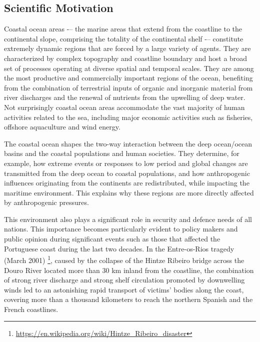 \subsection{Scientific Motivation}

Coastal ocean areas -– the marine areas that extend from the coastline
to the continental slope, comprising the totality of the continental
shelf -– constitute extremely dynamic regions that are forced by a
large variety of agents. They are characterized by complex topography
and coastline boundary and host a broad set of processes operating at
diverse spatial and temporal scales. They are among the most
productive and commercially important regions of the ocean, benefiting
from the combination of terrestrial inputs of organic and inorganic
material from river discharges and the renewal of nutrients from the
upwelling of deep water. Not surprisingly coastal ocean areas
accommodate the vast majority of human activities related to the sea,
including major economic activities such as fisheries, offshore
aquaculture and wind energy.
 
The coastal ocean shapes the two-way interaction between the deep
ocean/ocean basins and the coastal populations and human
societies. They determine, for example, how extreme events or
responses to low period and global changes are transmitted from the
deep ocean to coastal populations, and how anthropogenic influences
originating from the continents are redistributed, while impacting the
maritime environment. This explains why these regions are more
directly affected by anthropogenic pressures.
 

This environment also plays a significant role in security and defence
needs of all nations. This importance becomes particularly evident to
policy makers and public opinion during significant events such as
those that affected the Portuguese coast during the last two
decades. In the Entre-os-Rios tragedy (March 2001)
\footnote{\url{https://en.wikipedia.org/wiki/Hintze_Ribeiro_disaster}},
caused by the collapse of the Hintze Ribeiro bridge across the Douro
River located more than 30 km inland from the coastline, the
combination of strong river discharge and strong shelf circulation
promoted by downwelling winds led to an astonishing rapid transport of
victims' bodies along the coast, covering more than a thousand
kilometers to reach the northern Spanish and the French coastlines.

